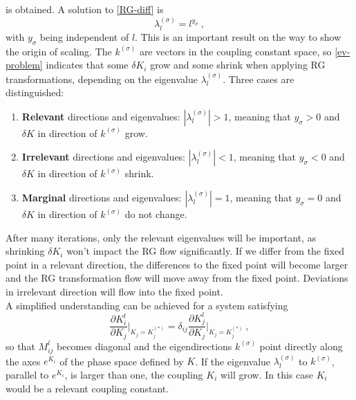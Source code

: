 	is obtained.
	A solution to \textsf{\autoref{RG-diff}} is
	\begin{equation} \label{ev-form}
		\lambda_l^{(\sigma)} = l^{y_\sigma}~,
	\end{equation}
	with $y_\sigma$ being independent of $l$. This is an important result on the way to show the origin of scaling. The $k^{(\sigma)}$ are vectors in the coupling constant space, so \autoref{ev-problem} indicates that some $\delta K_i$ grow and some shrink when applying RG transformations, depending on the eigenvalue $\lambda_l^{(\sigma)}$. Three cases are distinguished:
	\begin{enumerate}
		\item \textbf{Relevant} directions and eigenvalues:	$|\lambda_l^{(\sigma)}| > 1$, meaning that $y_\sigma > 0$ and $\delta K$ in direction of $k^{(\sigma)}$ grow.
		\item \textbf{Irrelevant} directions and eigenvalues:	$|\lambda_l^{(\sigma)}| < 1$, meaning that $y_\sigma < 0$ and $\delta K$ in direction of $k^{(\sigma)}$ shrink.
		\item \textbf{Marginal} directions and eigenvalues:	$|\lambda_l^{(\sigma)}| = 1$, meaning that $y_\sigma = 0$ and $\delta K$ in direction of $k^{(\sigma)}$ do not change.
	\end{enumerate}
	After many iterations, only the relevant eigenvalues will be important, as shrinking $\delta K_i$ won't impact the RG flow significantly. If we differ from the fixed point in a relevant direction, the differences to the fixed point will become larger and the RG transformation flow will move away from the fixed point. Deviations in irrelevant direction will flow into the fixed point. \\
	
	A simplified understanding can be achieved for a system satisfying
	\begin{equation}
		\frac{\partial K_i^l}{\partial K_j} \bigg |_{K_j = K_j^{(*)}} = \delta_{ij} \frac{\partial K_j^l}{\partial K_j} \bigg |_{K_j = K_j^{(*)}}~,
	\end{equation}
	so that $M^l_{ij}$ becomes diagonal and the eigendirections $k^{(\sigma)}$ point directly along the axes $e^{K_i}$ of the phase space defined by $K$. If the eigenvalue $\lambda_l^{(\sigma)}$ to $k^{(\sigma)}$, parallel to $e^{K_i}$, is larger than one, the coupling $K_i$ will grow. In this case $K_i$ would be a relevant coupling constant. \\
	
